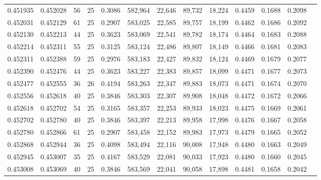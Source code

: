 \begin{tabular}{rrrrrrrrrrrrr}
0.451935 & 0.452028 &    56 &  25 &                                     0.3086 & 582,964 &  22,646 &  89,732 &  18,224 & 0.4459 & 0.1688 & 0.2098 \\
0.452031 & 0.452129 &    61 &  25 &                                     0.2907 & 583,025 &  22,585 &  89,757 &  18,199 & 0.4462 & 0.1686 & 0.2092 \\
0.452130 & 0.452213 &    44 &  25 &                                     0.3623 & 583,069 &  22,541 &  89,782 &  18,174 & 0.4464 & 0.1683 & 0.2088 \\
0.452214 & 0.452311 &    55 &  25 &                                     0.3125 & 583,124 &  22,486 &  89,807 &  18,149 & 0.4466 & 0.1681 & 0.2083 \\
0.452311 & 0.452388 &    59 &  25 &                                     0.2976 & 583,183 &  22,427 &  89,832 &  18,124 & 0.4469 & 0.1679 & 0.2077 \\
0.452390 & 0.452476 &    44 &  25 &                                     0.3623 & 583,227 &  22,383 &  89,857 &  18,099 & 0.4471 & 0.1677 & 0.2073 \\
0.452477 & 0.452555 &    36 &  26 &                                     0.4194 & 583,263 &  22,347 &  89,883 &  18,073 & 0.4471 & 0.1674 & 0.2070 \\
0.452556 & 0.452618 &    40 &  25 &                                     0.3846 & 583,303 &  22,307 &  89,908 &  18,048 & 0.4472 & 0.1672 & 0.2066 \\
0.452618 & 0.452702 &    54 &  25 &                                     0.3165 & 583,357 &  22,253 &  89,933 &  18,023 & 0.4475 & 0.1669 & 0.2061 \\
0.452702 & 0.452780 &    40 &  25 &                                     0.3846 & 583,397 &  22,213 &  89,958 &  17,998 & 0.4476 & 0.1667 & 0.2058 \\
0.452780 & 0.452866 &    61 &  25 &                                     0.2907 & 583,458 &  22,152 &  89,983 &  17,973 & 0.4479 & 0.1665 & 0.2052 \\
0.452868 & 0.452944 &    36 &  25 &                                     0.4098 & 583,494 &  22,116 &  90,008 &  17,948 & 0.4480 & 0.1663 & 0.2049 \\
0.452945 & 0.453007 &    35 &  25 &                                     0.4167 & 583,529 &  22,081 &  90,033 &  17,923 & 0.4480 & 0.1660 & 0.2045 \\
0.453008 & 0.453069 &    40 &  25 &                                     0.3846 & 583,569 &  22,041 &  90,058 &  17,898 & 0.4481 & 0.1658 & 0.2042 \\

\end{tabular}
